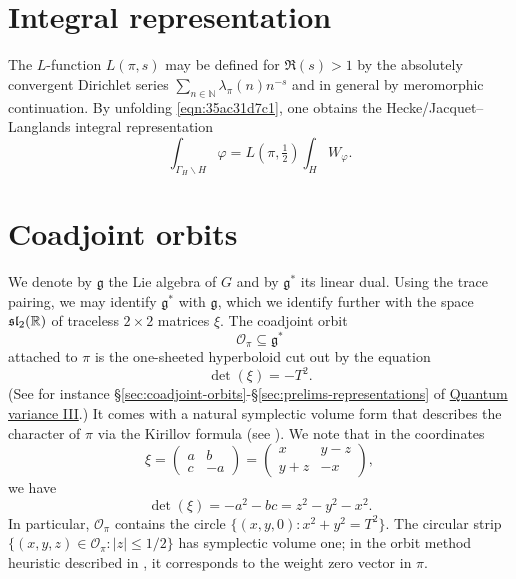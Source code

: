 \documentclass[reqno]{amsart} 
\numberwithin{equation}{section}
\numberwithin{theorem}{section}
\begin{document}
\section{Integral representation}\label{sec:org8f5cc20}
The $L$-function $L(\pi,s)$ may be defined for $\Re(s) > 1$ by the absolutely convergent Dirichlet series $\sum_{n \in \mathbb{N} } \lambda_\pi(n) n^{-s}$ and in general by meromorphic continuation.  By unfolding \eqref{eqn:35ac31d7c1}, one obtains the Hecke/Jacquet--Langlands integral representation
\begin{equation}\label{eq:int-_h-varphi}
  \int _{\Gamma_{H} \backslash H} \varphi = L(\pi,\tfrac{1}{2}) \int _H W_\varphi.
\end{equation}


\section{Coadjoint orbits}\label{sec:orge4ffe7c}
We denote by $\mathfrak{g}$ the Lie algebra of $G$ and by $\mathfrak{g}^*$ its linear dual.  Using the trace pairing, we may identify $\mathfrak{g}^*$ with $\mathfrak{g}$, which we identify further with the space $\operatorname{\mathfrak{s}\mathfrak{l}}_2(\mathbb{R})$ of traceless $2 \times 2$ matrices $\xi$.  The coadjoint orbit
\begin{equation*}
  \mathcal{O}_\pi \subseteq \mathfrak{g}^*
\end{equation*}
attached to $\pi$ is the one-sheeted hyperboloid cut out by the equation
\begin{equation*}
  \det(\xi) = -T^2.
\end{equation*}
(See for instance \S\ref{sec:coadjoint-orbits}-\S\ref{sec:prelims-representations} of \href{var-quat-3-submitted.pdf}{Quantum variance III}.) It comes with a natural symplectic volume form that describes the character of $\pi$ via the Kirillov formula (see \cite[\S6]{nelson-venkatesh-1}).  We note that in the coordinates
\begin{equation*}
  \xi =
  \begin{pmatrix}
    a & b \\
    c & -a
  \end{pmatrix}
  =
  \begin{pmatrix}
  x & y - z \\
  y + z & -x
\end{pmatrix},
\end{equation*}
we have
\begin{equation*}
  \det(\xi) = -a^2 - b c = z^2 - y^2 - x^2.
\end{equation*}
In particular, $\mathcal{O}_\pi$ contains the circle $\{(x,y,0) : x^2 + y^2 = T^2\}$.  The circular strip $\{(x,y,z) \in \mathcal{O}_\pi : |z| \leq 1/2\}$ has symplectic volume one; in the orbit method heuristic described in \cite[\S1.7]{nelson-venkatesh-1}, it corresponds to the weight zero vector in $\pi$.
\end{document}
